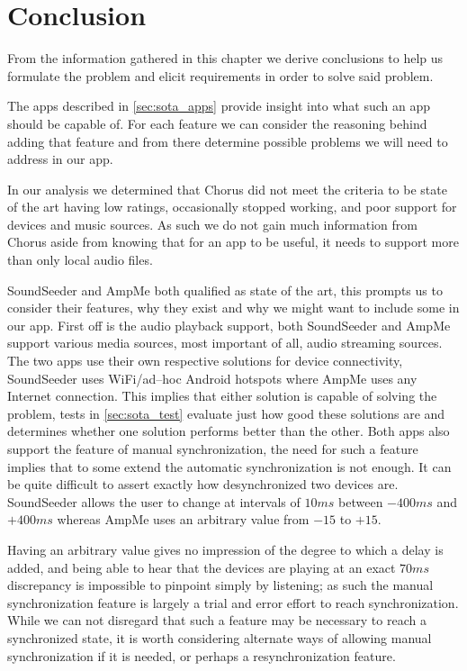 \section{Conclusion}
From the information gathered in this chapter we derive conclusions to help us formulate the problem and elicit requirements in order to solve said problem.

\bigskip
The apps described in \cref{sec:sota_apps} provide insight into what such an app should be capable of.
For each feature we can consider the reasoning behind adding that feature and from there determine possible problems we will need to address in our app.

In our analysis we determined that Chorus did not meet the criteria to be state of the art having low ratings, occasionally stopped working, and poor support for devices and music sources.
As such we do not gain much information from Chorus aside from knowing that for an app to be useful, it needs to support more than only local audio files.

SoundSeeder and AmpMe both qualified as state of the art, this prompts us to consider their features, why they exist and why we might want to include some in our app.
First off is the audio playback support, both SoundSeeder and AmpMe support various media sources, most important of all, audio streaming sources.
The two apps use their own respective solutions for device connectivity, SoundSeeder uses WiFi/ad--hoc Android hotspots where AmpMe uses any Internet connection.
This implies that either solution is capable of solving the problem, tests in \cref{sec:sota_test} evaluate just how good these solutions are and determines whether one solution performs better than the other.
Both apps also support the feature of manual synchronization, the need for such a feature implies that to some extend the automatic synchronization is not enough.
It can be quite difficult to assert exactly how desynchronized two devices are.
SoundSeeder allows the user to change at intervals of $10 ms$ between $-400 ms$ and $+400 ms$ whereas AmpMe uses an arbitrary value from $-15$ to $+15$.

Having an arbitrary value gives no impression of the degree to which a delay is added, and being able to hear that the devices are playing at an exact $70ms$ discrepancy is impossible to pinpoint simply by listening; as such the manual synchronization feature is largely a trial and error effort to reach synchronization.
While we can not disregard that such a feature may be necessary to reach a synchronized state, it is worth considering alternate ways of allowing manual synchronization if it is needed, or perhaps a resynchronization feature.

